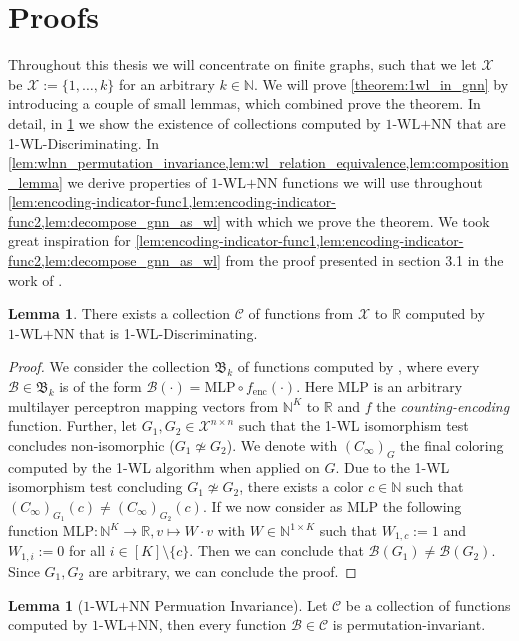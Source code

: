 \documentclass[11pt, dvipsnames, DIV=12]{scrreprt}
\theoremstyle{definition}
\newtheorem{lemma}[theorem]{Lemma}
\newcommand{\cB}{\mathcal{B}}
\newcommand{\cC}{\mathcal{C}}
\newcommand{\cX}{\mathcal{X}}
\newcommand{\Nb}{\mathbb{N}}
\newcommand{\Rb}{\mathbb{R}}
\newcommand{\wlnn}{\text{1-WL+NN}}
\begin{document}
\section{Proofs}
Throughout this thesis we will concentrate on finite graphs, such that we let $\mathcal{X}$ be $\mathcal{X} := \{1, \dots, k\}$ for an arbitrary $k \in \Nb$. We will prove \cref{theorem:1wl_in_gnn} by introducing a couple of small lemmas, which combined prove the theorem. In detail, in \cref{lem:wl_disc_exists} we show the existence of collections computed by $\wlnn$ that are 1-\!WL-Discriminating. In \cref{lem:wlnn_permutation_invariance,lem:wl_relation_equivalence,lem:composition_lemma} we derive properties of $\wlnn$ functions we will use throughout \cref{lem:encoding-indicator-func1,lem:encoding-indicator-func2,lem:decompose_gnn_as_wl} with which we prove the theorem.
We took great inspiration for \cref{lem:encoding-indicator-func1,lem:encoding-indicator-func2,lem:decompose_gnn_as_wl} from the proof presented in section 3.1 in the work of \cite{Chen2019}.

\begin{lemma}\label{lem:wl_disc_exists}
    There exists a collection $\cC$ of functions from $\cX$ to $\Rb$ computed by $\wlnn$ that is 1-\!WL-Discriminating.
\end{lemma}
\begin{proof}
We consider the collection $\mathfrak{B}_k$ of functions computed by \wlnn, where every $\mathcal{B} \in \mathfrak{B}_k$ is of the form $\mathcal{B}(\cdot) = \text{MLP} \circ f_{\text{enc}}(\cdot)$. Here MLP is an arbitrary multilayer perceptron mapping vectors from $\Nb^K$ to $\Rb$ and $f$ the \textit{counting-encoding} function. Further, let $G_1, G_2 \in \mathcal{X}^{n\times n}$ such that the 1-WL isomorphism test concludes non-isomorphic ($G_1 \not\simeq G_2$). We denote with $(C_{\infty})_G$ the final coloring computed by the 1-WL algorithm when applied on $G$.
Due to the 1-WL isomorphism test concluding $G_1 \not\simeq G_2$, there exists a color $c \in \Nb$ such that $(C_{\infty})_{G_1}(c) \neq (C_{\infty})_{G_2}(c)$. If we now consider as MLP the following function $\text{MLP}: \Nb^K \rightarrow \Rb, v \mapsto W \cdot v$ with $W \in \Nb^{1 \times K}$ such that $W_{1,c} := 1$ and $W_{1,i} := 0$ for all $i \in [K] \setminus \{c\}$. Then we can conclude that $\mathcal{B}(G_1) \neq \mathcal{B}(G_2)$. Since $G_1,G_2$ are arbitrary, we can conclude the proof.
\end{proof}

\begin{lemma}[$\wlnn$ Permuation Invariance]\label{lem:wlnn_permutation_invariance}
    Let $\cC$ be a collection of functions computed by $\wlnn$, then every function $\cB \in \cC$ is permutation-invariant.
\end{lemma}
\end{document}
